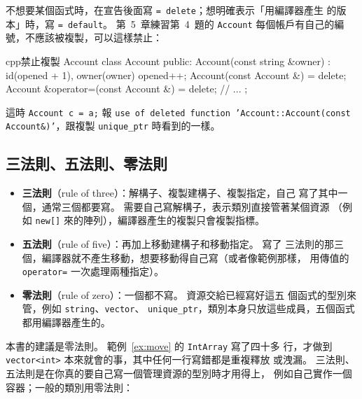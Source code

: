 不想要某個函式時，在宣告後面寫 \texttt{= delete}；想明確表示「用編譯器產生
的版本」時，寫 \texttt{= default}。 第~5~章練習第~4~題的 \texttt{Account}
每個帳戶有自己的編號，不應該被複製，可以這樣禁止：

\begin{code}{cpp}{禁止複製 Account}
class Account {
public:
    Account(const string &owner) : id(opened + 1), owner(owner) {
        opened++;
    }
    Account(const Account &) = delete;
    Account &operator=(const Account &) = delete;
    // ...
};
\end{code}

這時 \texttt{Account c = a;} 報 \texttt{use of deleted function
'Account::Account(const Account\&)'}，跟複製 \texttt{unique\_ptr} 時看到的一樣。

\subsection{三法則、五法則、零法則}

\begin{itemize}
\item \textbf{三法則}（rule of three）：解構子、複製建構子、複製指定，自己
寫了其中一個，通常三個都要寫。 需要自己寫解構子，表示類別直接管著某個資源
（例如 \texttt{new[]} 來的陣列），編譯器產生的複製只會複製指標。
\item \textbf{五法則}（rule of five）：再加上移動建構子和移動指定。 寫了
三法則的那三個，編譯器就不產生移動，想要移動得自己寫（或者像範例那樣，
用傳值的 \texttt{operator=} 一次處理兩種指定）。
\item \textbf{零法則}（rule of zero）：一個都不寫。 資源交給已經寫好這五
個函式的型別來管，例如 \texttt{string}、\texttt{vector}、
\texttt{unique\_ptr}，類別本身只放這些成員，五個函式都用編譯器產生的。
\end{itemize}

本書的建議是零法則。 範例~\ref{ex:move} 的 \texttt{IntArray} 寫了四十多
行，才做到 \texttt{vector<int>} 本來就會的事，其中任何一行寫錯都是重複釋放
或洩漏。 三法則、五法則是在你真的要自己寫一個管理資源的型別時才用得上，
例如自己實作一個容器；一般的類別用零法則：


